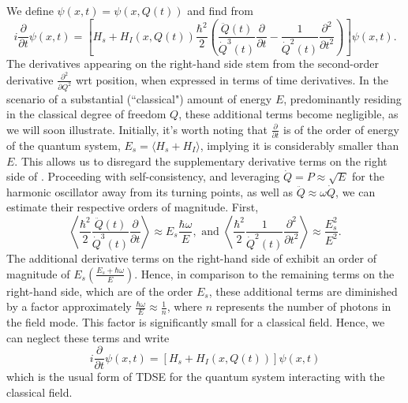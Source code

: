 We define \(\psi(x, t) = \psi(x, Q(t))\) and find from 
\begin{equation}
    \label{eq:class_jcm_eq15}
    i \frac{\partial}{\partial t}\psi(x, t) = \left[ H_s + H_I(x,Q(t)) 
    \frac{\hbar^2}{2} \left(\frac{\ddot{Q}(t)}{\dot{Q}^3(t)}\frac{\partial}{\partial t}
    - \frac{1}{\dot{Q}^2(t)} 
    \frac{\partial^2}{\partial t^2}\right)\right]\psi(x, t).
\end{equation}
The derivatives appearing on the right-hand side stem from the second-order derivative 
$\frac{\partial^2}{\partial Q^2}$ wrt position, when expressed in terms 
of time derivatives. In the scenario of a substantial (``classical") amount of 
energy $E$, predominantly residing in the classical degree of freedom $Q$, these additional 
terms become negligible, as we will soon illustrate. Initially, it's worth noting that 
$\frac{\partial}{\partial t}$ is of the order of energy of the quantum system, 
$E_s = \langle H_s + H_I\rangle$, implying it is considerably smaller than $E$. This allows us to 
disregard the supplementary derivative terms on the right side of . 
Proceeding with self-consistency, and leveraging ${\dot{Q}} = P \approx \sqrt{E}$ 
for the harmonic oscillator away from its turning points, as well as 
$\ddot{Q} \approx \omega \dot{Q}$, we can estimate their respective orders of magnitude.
First, 
\begin{equation}
    \label{eq:class_jcm_eq16}
    \left \langle \frac{\hbar^2}{2} \frac{\ddot{Q}(t)}{\dot{Q}^3(t)}\frac{\partial}{\partial t} \right\rangle
    \approx E_s \frac{\hbar \omega}{E}, \text{ and } \left \langle\frac{\hbar^2}{2} \frac{1}{\dot{Q}^2(t)} 
    \frac{\partial^2}{\partial t^2} \right\rangle \approx \frac{E_s^2}{E^2}.
\end{equation}
The additional derivative terms on the right-hand side of  
exhibit an order of magnitude of $E_s\left(\frac{E_s + \hbar \omega}{E}\right)$. 
Hence, in comparison to the remaining terms on the right-hand side, which are of 
the order $E_s$, these additional terms are diminished by a factor approximately 
$\frac{\hbar \omega}{E} \approx \frac{1}{n}$, where $n$ represents the number of
photons in the field mode.
This factor is significantly small for a classical field. Hence, we can neglect these 
terms and write
\begin{equation}
    \label{eq:class_jcm_eq17}
    i \frac{\partial}{\partial t}\psi(x, t) = \left[ H_s + H_I(x,Q(t))\right]\psi(x, t)
\end{equation}
which is the usual form of TDSE for the quantum system interacting with the classical field.

